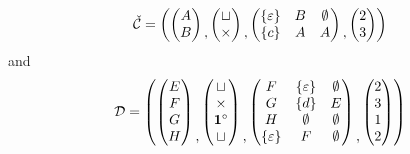 \[
    \check{\mathcal{C}} = \left(
    \begin{pmatrix}
        A\\B    
    \end{pmatrix}
    \begin{matrix}\\,\end{matrix}
    \begin{pmatrix}
        \sqcup\\
        \times
    \end{pmatrix}
    \begin{matrix}\\,\end{matrix}
    \begin{pmatrix}
        \left\{\varepsilon\right\} & B & \emptyset\\
        \left\{c\right\} & A & A
    \end{pmatrix}
    \begin{matrix}\\,\end{matrix}
    \begin{pmatrix}
        2\\3
    \end{pmatrix}
    \right)
\]
and
\[
    \mathcal{D} = \left(
        \begin{pmatrix}
            E\\F\\G\\H
        \end{pmatrix}
        \begin{matrix}\\\\\\,\end{matrix}
        \begin{pmatrix}
            \sqcup\\\times\\\mathbf{1}^\circ\\\sqcup
        \end{pmatrix}
        \begin{matrix}\\\\\\,\end{matrix}
        \begin{pmatrix}
            F & \left\{\varepsilon\right\} & \emptyset\\
            G & \left\{d\right\} & E\\
            H & \emptyset & \emptyset\\
            \left\{\varepsilon\right\} & F & \emptyset
        \end{pmatrix}
        \begin{matrix}\\\\\\,\end{matrix}
        \begin{pmatrix}
            2\\3\\1\\2
        \end{pmatrix}
    \right)
\]
